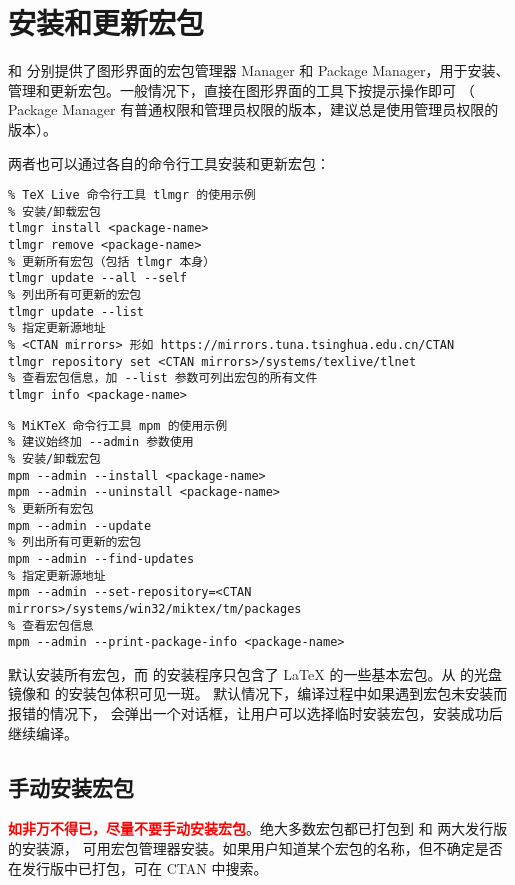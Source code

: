\section{安装和更新宏包}\label{sec:pkg-manager}

 和  分别提供了图形界面的宏包管理器  Manager 和
 Package Manager，用于安装、管理和更新宏包。一般情况下，直接在图形界面的工具下按提示操作即可
（ Package Manager 有普通权限和管理员权限的版本，建议总是使用管理员权限的版本）。

两者也可以通过各自的命令行工具安装和更新宏包：
\begin{verbatim}
% TeX Live 命令行工具 tlmgr 的使用示例
% 安装/卸载宏包
tlmgr install <package-name>
tlmgr remove <package-name>
% 更新所有宏包（包括 tlmgr 本身）
tlmgr update --all --self
% 列出所有可更新的宏包
tlmgr update --list
% 指定更新源地址
% <CTAN mirrors> 形如 https://mirrors.tuna.tsinghua.edu.cn/CTAN
tlmgr repository set <CTAN mirrors>/systems/texlive/tlnet
% 查看宏包信息，加 --list 参数可列出宏包的所有文件
tlmgr info <package-name>
\end{verbatim}

\begin{verbatim}
% MiKTeX 命令行工具 mpm 的使用示例
% 建议始终加 --admin 参数使用
% 安装/卸载宏包
mpm --admin --install <package-name>
mpm --admin --uninstall <package-name>
% 更新所有宏包
mpm --admin --update
% 列出所有可更新的宏包
mpm --admin --find-updates
% 指定更新源地址
mpm --admin --set-repository=<CTAN mirrors>/systems/win32/miktex/tm/packages
% 查看宏包信息
mpm --admin --print-package-info <package-name>
\end{verbatim}

 默认安装所有宏包，而  的安装程序只包含了 \LaTeX{} 的一些基本宏包。从  的光盘镜像和  的安装包体积可见一斑。
默认情况下，编译过程中如果遇到宏包未安装而报错的情况下， 会弹出一个对话框，让用户可以选择临时安装宏包，安装成功后继续编译。

\subsection{手动安装宏包}\label{subsec:pkg-manual-install}

\textbf{\textcolor{red}{如非万不得已，尽量不要手动安装宏包}}。绝大多数宏包都已打包到  和  两大发行版的安装源，
可用宏包管理器安装。如果用户知道某个宏包的名称，但不确定是否在发行版中已打包，可在 CTAN 中搜索。

